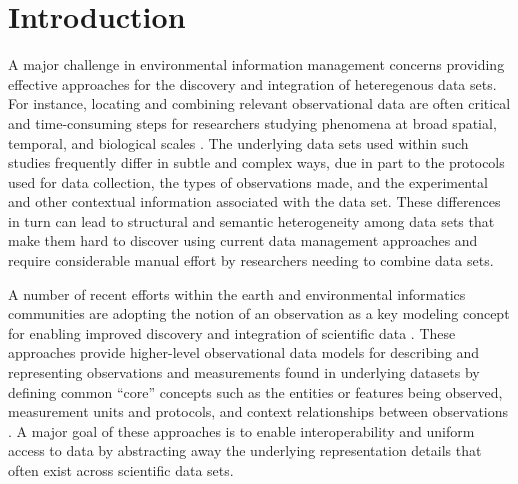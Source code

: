 
\section{Introduction}
\label{sec-intro}

A major challenge in environmental information management concerns
providing effective approaches for the discovery and integration of
heteregenous data sets. For instance, locating and combining relevant
observational data are often critical and time-consuming steps for
researchers studying phenomena at broad spatial, temporal, and
biological scales
\cite{worm06:_impac_of_biodiv_loss_ocean_ecosy_servic,pennings05:_do,green05:_compl_in_ecolog_and_conser,sorokina09:_detec_inter_variab_inter_obser_ornit_data,jackson01:_histor_overf_and_recen_collap}. The
underlying data sets used within such studies frequently differ in
subtle and complex ways, due in part to the protocols used for data
collection, the types of observations made, and the experimental and
other contextual information associated with the data set. These
differences in turn can lead to structural and semantic heterogeneity
among data sets that make them hard to discover using current data
management approaches and require considerable manual effort by
researchers needing to combine data sets.

A number of recent efforts within the earth and environmental
informatics communities are adopting the notion of an observation as a
key modeling concept for enabling improved discovery and integration
of scientific data
\cite{om,fox09:_ontol,tarboton07:_cuahs_commun_obser_data_model,cushing07:_compon_based_end_user_datab,balhoff10:_phenex,bowers08}. These
approaches provide higher-level observational data models for
describing and representing observations and measurements found in
underlying datasets by defining common ``core'' concepts such as the
entities or features being observed, measurement units and protocols,
and context relationships between observations \cite{om,bowers08}.  A
major goal of these approaches is to enable interoperability and
uniform access to data by abstracting away the underlying
representation details that often exist across scientific data sets.

